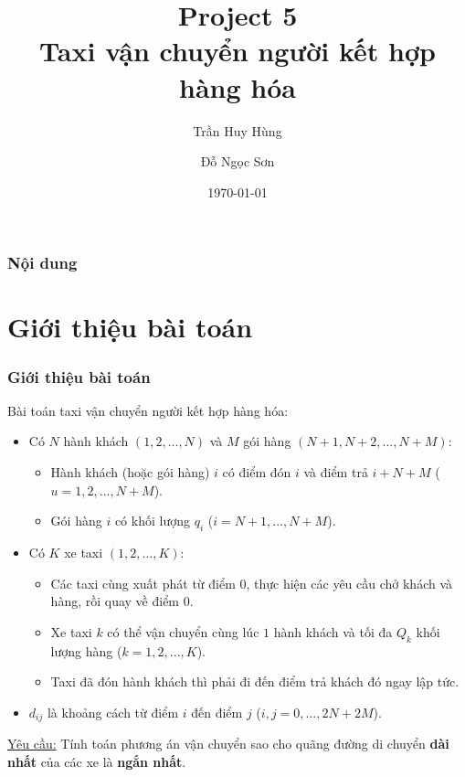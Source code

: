 \documentclass{beamer}
\title[Project 5]{Project 5 \\
	Taxi vận chuyển người kết hợp hàng hóa} %
\author{Trần Huy Hùng\and Đỗ Ngọc Sơn} %
\institute[HUST] %
{
	Đại học Bách Khoa Hà Nội \\ %
	\medskip
}
\date{\today} %
\begin{document}
	
	\maketitle
	
	\begin{frame}
		\frametitle{Nội dung} %
		\tableofcontents[hidesubsections]
	\end{frame}
	
	
	\section{Giới thiệu bài toán} %
	
	
	\begin{frame}
		\frametitle{Giới thiệu bài toán}
		Bài toán taxi vận chuyển người kết hợp hàng hóa:
		\begin{itemize}
			\item {
				Có $N$ hành khách $(1,2,...,N)$ và $M$ gói hàng $(N+1,N+2,...,N+M)$:
				\begin{itemize}
					\item Hành khách (hoặc gói hàng) $i$ có điểm đón $i$ và điểm trả $i+N+M$ ($u=1,2,...,N+M$).
					\item Gói hàng $i$ có khối lượng $q_i$ ($i=N+1,...,N+M$).
				\end{itemize}
			}
			\item {
				Có $K$ xe taxi $(1,2,...,K)$:
				\begin{itemize}
					\item Các taxi cùng xuất phát từ điểm $0$, thực hiện các yêu cầu chở khách và hàng, rồi quay về điểm $0$.
					\item Xe taxi $k$ có thể vận chuyển cùng lúc $1$ hành khách và tối đa $Q_k$ khối lượng hàng ($k=1,2,...,K$).
					\item Taxi đã đón hành khách thì phải đi đến điểm trả khách đó ngay lập tức.
				\end{itemize}
			}
			\item $d_{ij}$ là khoảng cách từ điểm $i$ đến điểm $j$ ($i,j=0,...,2N+2M$).
		\end{itemize}
		\underline{Yêu cầu:} Tính toán phương án vận chuyển sao cho quãng đường di chuyển \textbf{dài nhất} của các xe là \textbf{ngắn nhất}.
	\end{frame}
\end{document}
